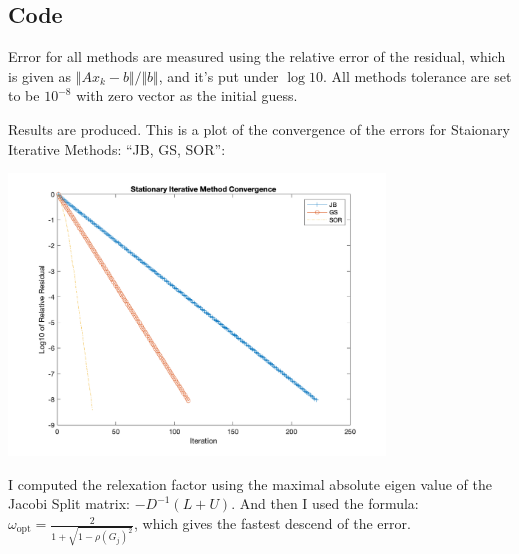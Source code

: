 \documentclass[]{article}
\begin{document}
    \subsection*{Code}
    
    
    
    Error for all methods are measured using the relative error of the residual, which is given as $\Vert Ax_k -b\Vert/\Vert b\Vert$, and it's put under $\log10$. All methods tolerance are set to be $10^{-8}$ with zero vector as the initial guess. 
    \par
    Results are produced. This is a plot of the convergence of the errors for Staionary Iterative Methods: ``JB, GS, SOR'': 
    \begin{center}
        \includegraphics[width=10cm]{stationary_methods.png}
    \end{center}
    \par
    I computed the relexation factor using the maximal absolute eigen value of the Jacobi Split matrix: $-D^{-1}(L +U)$. And then I used the formula: $\omega_{\text{opt}} = \frac{2}{1 + \sqrt{1 - \rho(G_j)^2}}$, which gives the fastest descend of the error. 
\end{document}
